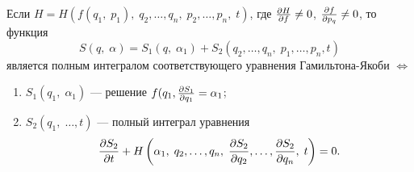 \begin{teo}
	Если $H = H(f(q_1,\; p_1),\; q_2,\ldots,q_n,\; p_2,\ldots,p_n,\; t)$, где $\frac{\partial H}{\partial f} \neq 0$, $\frac{\partial f}{\partial p_q} \neq 0$, то функция 
	\[
		S(q,\;\alpha) = S_1(q,\; \alpha_1) + S_2(q_2,\ldots,q_n,\; p_1,\ldots,p_n, t)
	\]
	является полным интегралом соответствующего уравнения Гамильтона-Якоби $\Leftrightarrow$
	\begin{enumerate}
		\item $S_1(q_1,\; \alpha_1)$ --- решение $f(q_1, \frac{\partial S_1}{\partial q_1} = \alpha_1$;
		\item $S_2(q_1,\; \ldots, t)$ --- полный интеграл уравнения \[
			\frac{\partial S_2}{\partial t} + H\left( \alpha_1,\; q_2,\ldots,q_n,\; \frac{\partial S_2}{\partial q_2},\ldots,\frac{\partial S_2}{\partial q_n},\; t \right) = 0.
		\]	
	\end{enumerate}
\end{teo}
